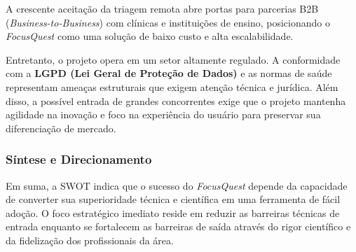 \documentclass[11pt,a4paper]{article}
\begin{document}
A crescente aceitação da triagem remota abre portas para parcerias B2B (\textit{Business-to-Business}) com clínicas e instituições de ensino, posicionando o \textit{FocusQuest} como uma solução de baixo custo e alta escalabilidade. 

Entretanto, o projeto opera em um setor altamente regulado. A conformidade com a \textbf{LGPD (Lei Geral de Proteção de Dados)} e as normas de saúde representam ameaças estruturais que exigem atenção técnica e jurídica. Além disso, a possível entrada de grandes concorrentes exige que o projeto mantenha agilidade na inovação e foco na experiência do usuário para preservar sua diferenciação de mercado.

\subsubsection{Síntese e Direcionamento}

Em suma, a SWOT indica que o sucesso do \textit{FocusQuest} depende da capacidade de converter sua superioridade técnica e científica em uma ferramenta de fácil adoção. O foco estratégico imediato reside em reduzir as barreiras técnicas de entrada enquanto se fortalecem as barreiras de saída através do rigor científico e da fidelização dos profissionais da área.
\end{document}

